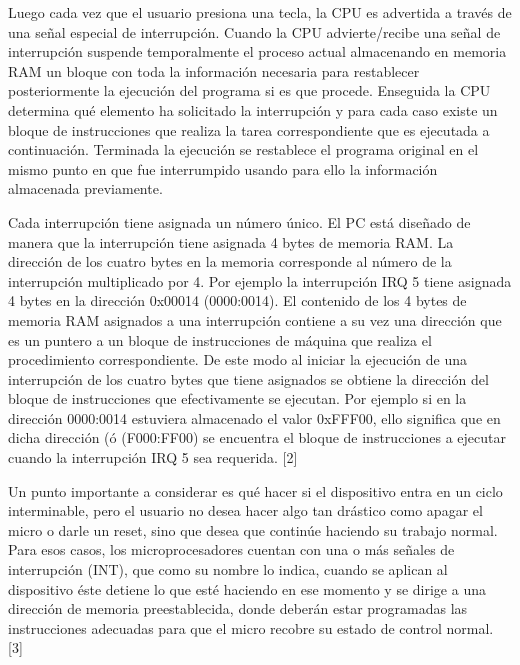 \documentclass{article}
\begin{document}
Luego cada vez que el usuario presiona una tecla, la CPU es advertida a través de una señal especial de interrupción. Cuando la CPU advierte/recibe una señal de interrupción suspende temporalmente el proceso actual almacenando en memoria RAM un bloque con toda la información necesaria para restablecer posteriormente la ejecución del programa si es que procede. Enseguida la CPU determina qué elemento ha solicitado la interrupción y para cada caso existe un bloque de instrucciones que realiza la tarea correspondiente que es ejecutada a continuación. Terminada la ejecución se restablece el programa original en el mismo punto en que fue interrumpido usando para ello la información almacenada previamente.

Cada interrupción tiene asignada un número único. El PC está diseñado de manera que la interrupción tiene asignada 4 bytes de memoria RAM. La dirección de los cuatro bytes en la memoria corresponde al número de la interrupción multiplicado por 4. Por ejemplo la interrupción IRQ 5 tiene asignada 4 bytes en la dirección 0x00014 (0000:0014). El contenido de los 4 bytes de memoria RAM asignados a una interrupción contiene a su vez una dirección que es un puntero a un bloque de instrucciones de máquina que realiza el procedimiento correspondiente. De este modo al iniciar la ejecución de una interrupción de los cuatro bytes que tiene asignados se obtiene la dirección del bloque de instrucciones que efectivamente se ejecutan. Por ejemplo si en la dirección 0000:0014 estuviera almacenado el valor 0xFFF00, ello significa que en dicha dirección (ó (F000:FF00) se encuentra el bloque de instrucciones a ejecutar cuando la interrupción IRQ 5 sea requerida. [2]

Un punto importante a considerar es qué hacer si el dispositivo entra en un ciclo interminable, pero el usuario no desea hacer algo tan drástico como apagar el micro o darle un reset, sino que desea que continúe haciendo su trabajo normal. Para esos casos, los microprocesadores cuentan con una o más señales de interrupción (INT), que como su nombre lo indica, cuando se aplican al dispositivo éste detiene lo que esté haciendo en ese momento y se dirige a una dirección de memoria preestablecida, donde deberán estar programadas las instrucciones adecuadas para que el micro recobre su estado de control normal. [3]
\end{document}
